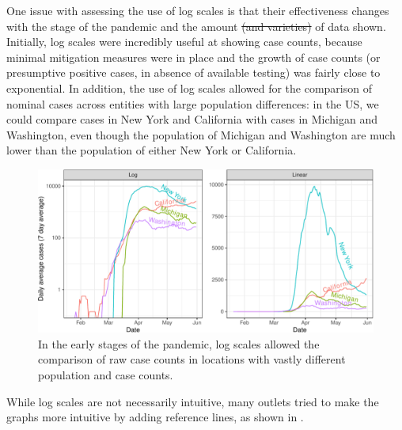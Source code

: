 \documentclass[article]{jdssv}\usepackage[]{graphicx}\usepackage[]{xcolor} %
\newenvironment{knitrout}{}{} %
\providecommand{\DIFadd}[1]{{\protect\color{blue}\uwave{#1}}} %
\providecommand{\DIFdel}[1]{{\protect\color{red}\sout{#1}}}                      %
\providecommand{\DIFaddbegin}{} %
\providecommand{\DIFaddend}{} %
\providecommand{\DIFdelbegin}{} %
\providecommand{\DIFdelend}{} %
\newcommand{\DIFscaledelfig}{0.5}
\newlength{\DIFdelgraphicswidth} %
\newlength{\DIFdelgraphicsheight} %
\newcommand{\DIFaddincludegraphics}[2][]{{\color{blue}\fbox{\DIFOincludegraphics[#1]{#2}}}} %
\newcommand{\DIFdelincludegraphics}[2][]{%
\sbox{\DIFdelgraphicsbox}{\DIFOincludegraphics[#1]{#2}}%
\settoboxwidth{\DIFdelgraphicswidth}{\DIFdelgraphicsbox} %
\settoboxtotalheight{\DIFdelgraphicsheight}{\DIFdelgraphicsbox} %
\scalebox{\DIFscaledelfig}{%
\parbox[b]{\DIFdelgraphicswidth}{\usebox{\DIFdelgraphicsbox}\\[-\baselineskip] \rule{\DIFdelgraphicswidth}{0em}}\llap{\resizebox{\DIFdelgraphicswidth}{\DIFdelgraphicsheight}{%
\setlength{\unitlength}{\DIFdelgraphicswidth}%
\begin{picture}(1,1)%
\thicklines\linethickness{2pt} %
{\color[rgb]{1,0,0}\put(0,0){\framebox(1,1){}}}%
{\color[rgb]{1,0,0}\put(0,0){\line( 1,1){1}}}%
{\color[rgb]{1,0,0}\put(0,1){\line(1,-1){1}}}%
\end{picture}%
}\hspace*{3pt}}} %
} %
\DeclareRobustCommand{\DIFaddbegin}{\DIFOaddbegin \let\includegraphics\DIFaddincludegraphics} %
\DeclareRobustCommand{\DIFaddend}{\DIFOaddend \let\includegraphics\DIFOincludegraphics} %
\DeclareRobustCommand{\DIFdelbegin}{\DIFOdelbegin \let\includegraphics\DIFdelincludegraphics} %
\DeclareRobustCommand{\DIFdelend}{\DIFOaddend \let\includegraphics\DIFOincludegraphics} %
\begin{document}
One issue with assessing the use of log scales is that their effectiveness changes with the stage of the pandemic and the amount \DIFdelbegin \DIFdel{(and varieties) }\DIFdelend \DIFaddbegin \DIFadd{and variety }\DIFaddend of data shown. Initially, log scales were incredibly useful at showing case counts, because minimal mitigation measures were in place and the growth of case counts (or presumptive positive cases, in absence of available testing) was fairly close to exponential. In addition, the use of log scales allowed for the comparison of nominal cases across entities with large population differences: in the US, we could compare cases in New York and California with cases in Michigan and Washington, even though the population of Michigan and Washington are much lower than the population of either New York or California. 

\begin{knitrout}\footnotesize
{}\color{fgcolor}\begin{figure}

{\centering \includegraphics[width=\linewidth]{Figures_R/fig-log-scale-initial-1} 

}

\caption[In the early stages of the pandemic, log scales allowed the comparison of raw case counts in locations with vastly different population and case counts]{In the early stages of the pandemic, log scales allowed the comparison of raw case counts in locations with vastly different population and case counts.}\label{fig:log-scale-initial}
\end{figure}

\end{knitrout}

While log scales are not necessarily intuitive, many outlets tried to make the graphs more intuitive by adding reference lines, as shown in . 
\end{document}

